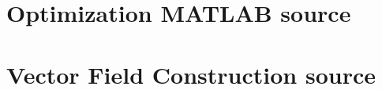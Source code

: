 \documentclass[numbered,pdftex]{ohio-etd}
\begin{document}
\chapter{Optimization MATLAB source}

\chapter{Vector Field Construction source}



   

\end{document}
